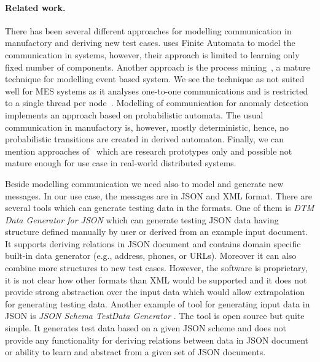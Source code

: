 {\paragraph{Related work.} There has been several different approaches for
modelling communication in manufactory and deriving new test cases.
%
\cite{csight} uses Finite Automata to model the communication in systems,
however, their approach is limited to learning only fixed number of components.
%
Another approach is the process mining~\cite{procmin}, a mature technique for
modelling event based system. We see the technique as not suited well for MES
systems as it analyses one-to-one communications and is restricted to a single
thread per node~\cite{procmindist}.
%
%
Modelling of communication for anomaly detection~\cite{havlena} implements an
approach based on probabilistic automata.  
%
The usual communication in manufactory is, however, mostly deterministic,
hence, no probabilistic transitions are created in derived automaton.  
%
Finally, we can mention approaches of~\cite{prospex,icpn08,wcre09} which are
research prototypes only and possible not mature enough for use case in
real-world distributed systems.

Beside modelling communication we need also to model and generate new messages.
In our use case, the messages are in JSON and XML format.
There are several tools which can generate testing data in the formats.
One of them is \emph{DTM Data Generator for JSON} \cite{ref_dtm} which can
generate testing JSON data having structure defined manually by user
or derived from an example input document.
It supports deriving relations in JSON document and contains domain
specific built-in data generator (e.g., address, phones, or URLs).
Moreover it can also combine more structures to new test cases.
However, the software is proprietary, it is not clear how other
formats than XML would be supported and it does not provide
strong abstraction over the input data which would allow
extrapolation for generating testing data.
Another example of tool for generating input data in JSON is \emph{JSON Schema TestData Generator} \cite{ref_stg}.
The tool is open source but quite simple.
It generates test data based on a given JSON scheme and does not provide
any functionality for deriving relations between data in JSON document
or ability to learn and abstract from a given set of JSON documents.

}
